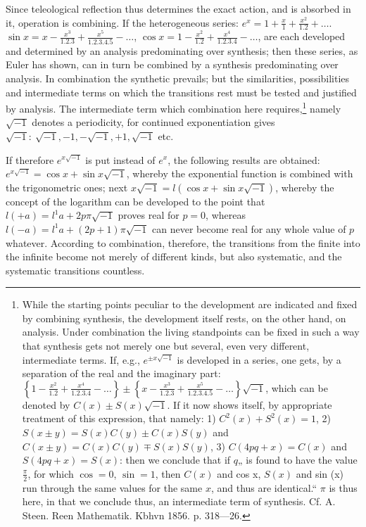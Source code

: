 \documentclass[12pt,a4paper,openany]{book}
\newcommand{\opage}[1]{\marginnote{\footnotesize\textit{[#1]}}}
\begin{document}
Since teleological reflection thus determines the exact action, and is absorbed in it, operation is combining. If the heterogeneous series: $e^{x}=1+\frac{x}{1}+\frac{x^{2}}{1.2}+\ldots.$ $\sin x=x-\frac{x^{3}}{1.2.3}+\frac{x^{5}}{1.2.3.4.5}-\ldots$,
$\cos x=1-\frac{x^{2}}{1.2}+\frac{x^{4}}{1.2.3.4}-\ldots$, are each developed and determined by an analysis predominating over synthesis; then these series, as Euler has shown, can in turn be combined by a synthesis predominating over analysis. In combination the synthetic prevails; but the similarities, possibilities and intermediate terms on which the transitions rest must be tested and justified by analysis. The intermediate term which combination here requires,\footnote[1]{While the starting points peculiar to the development are indicated and fixed by combining synthesis, the development itself rests, on the other hand, on analysis. Under combination the living standpoints can be fixed in such a way that synthesis gets not merely one but several, even very different, intermediate terms. If, e.g., $e^{\pm x\sqrt{-1}}$ is developed in a series, one gets, by a separation of the real and the imaginary part: $\left\{1-\frac{x^{2}}{1.2}+\frac{x^{4}}{1.2.3.4}-\ldots\right\}\pm\left\{x-\frac{x^{3}}{1.2.3}+\frac{x^{5}}{1.2.3.4.5}-\ldots\right\}\sqrt{-1}$, which can be denoted by $C(x)\pm S(x)\sqrt{-1}$. If it now shows itself, by appropriate treatment of this expression, that namely: 1) $C^{2}(x)+S^{2}(x)=1$, 2) $S(x\pm y)=S(x)C(y)\pm C(x)S(y)$ and $C(x\pm y)=C(x)C(y)\mp S(x)S(y)$, 3) $C(4pq+x)=C(x)$ and $S(4pq+x)=S(x)$: then we conclude that if $q$„ is found to have the value $\frac{\pi}{2}$, for which $\cos=0$, $\sin=1$, then $C(x)$ and cos x, $S(x)$ and sin (x) run through the same values for the same $x$, and thus are identical.“ $\pi$ is thus here, in that we conclude thus, an intermediate term of synthesis. Cf. A. Steen. Reen Mathematik. Kbhvn 1856. p. 318—26.} namely $\sqrt{-1}$
\setcounter{footnote}{0}%
\opage{48}denotes a periodicity, for continued exponentiation gives $\sqrt{-1}:\ \sqrt{-1},-1,-\sqrt{-1},+1,\sqrt{-1}$ etc.

If therefore $e^{x\sqrt{-1}}$ is put instead of $e^{x}$, the following results are obtained:
$e^{x\sqrt{-1}}=\cos x+\sin x\sqrt{-1}$, whereby the exponential function is combined with the trigonometric ones; next $x\sqrt{-1}=l(\cos x+\sin x\sqrt{-1})$, whereby the concept of the logarithm can be developed to the point that $l(+a)=l^{1}a+2p\pi\sqrt{-1}$ proves real for $p=0$, whereas $l(-a)=l^{1}a+(2p+1)\pi\sqrt{-1}$ can never become real for any whole value of $p$ whatever. According to combination, therefore, the transitions from the finite into the infinite become not merely of different kinds, but also systematic, and the systematic transitions countless.
\end{document}
